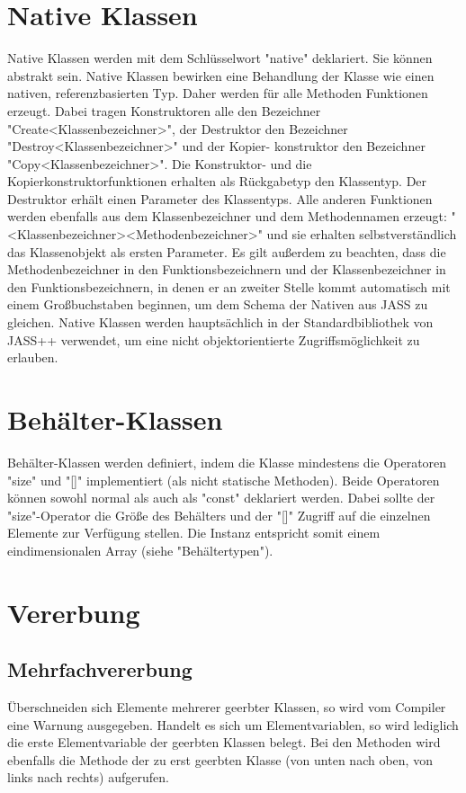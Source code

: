 \section{Native Klassen}
Native Klassen werden mit dem Schlüsselwort "native" deklariert. Sie können abstrakt sein.
Native Klassen bewirken eine Behandlung der Klasse wie einen nativen, referenzbasierten Typ.
Daher werden für alle Methoden Funktionen erzeugt. Dabei tragen Konstruktoren alle den Bezeichner
"Create<Klassenbezeichner>", der Destruktor den Bezeichner "Destroy<Klassenbezeichner>" und der Kopier-
konstruktor den Bezeichner "Copy<Klassenbezeichner>".
Die Konstruktor- und die Kopierkonstruktorfunktionen erhalten als Rückgabetyp den Klassentyp.
Der Destruktor erhält einen Parameter des Klassentyps.
Alle anderen Funktionen werden ebenfalls aus dem Klassenbezeichner und dem Methodennamen erzeugt:
"<Klassenbezeichner><Methodenbezeichner>" und sie erhalten selbstverständlich das Klassenobjekt als
ersten Parameter.
Es gilt außerdem zu beachten, dass die Methodenbezeichner in den Funktionsbezeichnern und der Klassenbezeichner in den
Funktionsbezeichnern, in denen er an zweiter Stelle kommt automatisch mit einem Großbuchstaben beginnen,
um dem Schema der Nativen aus JASS zu gleichen.
Native Klassen werden hauptsächlich in der Standardbibliothek von JASS++ verwendet, um eine nicht objektorientierte
Zugriffsmöglichkeit zu erlauben.

\section{Behälter-Klassen}
Behälter-Klassen werden definiert, indem die Klasse mindestens die Operatoren "size" und "[]" implementiert (als nicht statische Methoden).
Beide Operatoren können sowohl normal als auch als "const" deklariert werden.
Dabei sollte der "size"-Operator die Größe des Behälters und der "[]" Zugriff auf die einzelnen Elemente zur Verfügung stellen.
Die Instanz entspricht somit einem eindimensionalen Array (siehe "Behältertypen").

\section{Vererbung}

\subsection{Mehrfachvererbung}
Überschneiden sich Elemente mehrerer geerbter Klassen, so wird vom Compiler eine Warnung ausgegeben.
Handelt es sich um Elementvariablen, so wird lediglich die erste Elementvariable der geerbten Klassen belegt.
Bei den Methoden wird ebenfalls die Methode der zu erst geerbten Klasse (von unten nach oben, von links nach rechts) aufgerufen.

